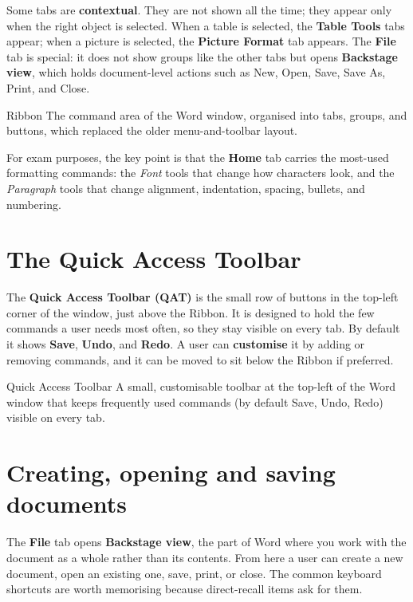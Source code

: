 Some tabs are \textbf{contextual}. They are not shown all the time; they
appear only when the right object is selected. When a table is selected, the
\textbf{Table Tools} tabs appear; when a picture is selected, the
\textbf{Picture Format} tab appears. The \textbf{File} tab is special: it
does not show groups like the other tabs but opens \textbf{Backstage view},
which holds document-level actions such as New, Open, Save, Save As, Print,
and Close.

\begin{definitionbox}{Ribbon}
The command area of the Word window, organised into tabs, groups, and
buttons, which replaced the older menu-and-toolbar layout.
\end{definitionbox}

For exam purposes, the key point is that the \textbf{Home} tab carries the
most-used formatting commands: the \emph{Font} tools that change how
characters look, and the \emph{Paragraph} tools that change alignment,
indentation, spacing, bullets, and numbering.

\section{The Quick Access Toolbar}
The \textbf{Quick Access Toolbar (QAT)} is the small row of buttons in the
top-left corner of the window, just above the Ribbon. It is designed to hold
the few commands a user needs most often, so they stay visible on every tab.
By default it shows \textbf{Save}, \textbf{Undo}, and \textbf{Redo}. A user
can \textbf{customise} it by adding or removing commands, and it can be moved
to sit below the Ribbon if preferred.

\begin{definitionbox}{Quick Access Toolbar}
A small, customisable toolbar at the top-left of the Word window that keeps
frequently used commands (by default Save, Undo, Redo) visible on every tab.
\end{definitionbox}

\section{Creating, opening and saving documents}
The \textbf{File} tab opens \textbf{Backstage view}, the part of Word where
you work with the document as a whole rather than its contents. From here a
user can create a new document, open an existing one, save, print, or close.
The common keyboard shortcuts are worth memorising because direct-recall
items ask for them.

